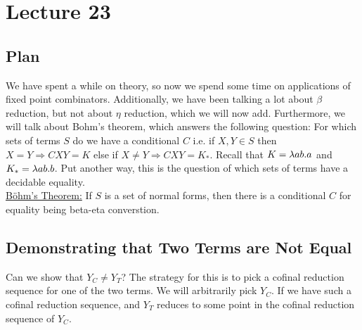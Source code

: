 \chapter{Lecture 23}

\section{Plan}
We have spent a while on theory, so now we spend some time on applications of fixed point combinators. Additionally, we have been talking a lot about $\beta$ reduction, but not about $\eta$ reduction, which we will now add. Furthermore, we will talk about Bohm's theorem, which answers the following question: For which sets of terms $S$ do we have a conditional $C$ i.e. if $X,Y \in S$ then $X = Y \Rightarrow CXY = K$ else if $X \not= Y \Rightarrow CXY = K_*$. Recall that $K = \lambda ab.a$ and $K_* = \lambda ab.b$. Put another way, this is the question of which sets of terms have a decidable equality.\\

\uline{B\"ohm's Theorem:} If $S$ is a set of normal forms, then there is a conditional $C$ for equality being beta-eta converstion.

\section{Demonstrating that Two Terms are Not Equal}

Can we show that $Y_C \not= Y_T$? The strategy for this is to pick a cofinal reduction sequence for one of the two terms. We will arbitrarily pick $Y_C$. If we have such a cofinal reduction sequence, and $Y_T$ reduces to some point in the cofinal reduction sequence of $Y_C$.
\begin{center}
\end{center}

